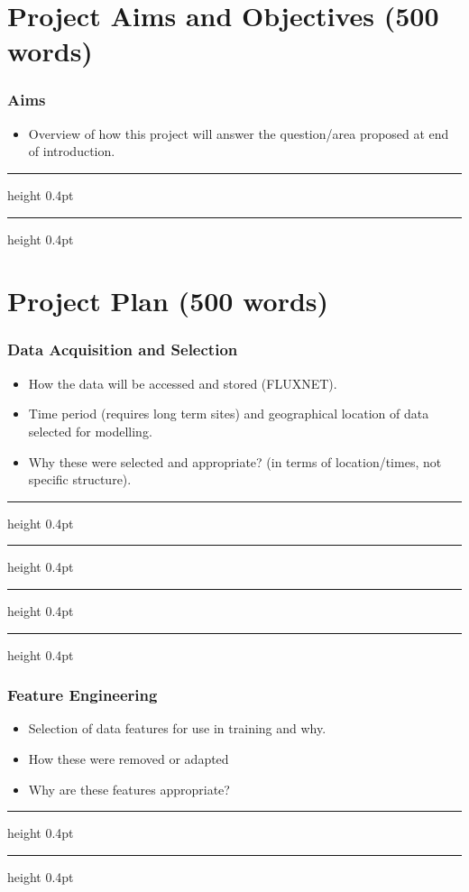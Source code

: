 \documentclass[paper=a4, fontsize=12pt]{scrartcl}
\newcommand{\notedivider}{%
	\vspace{4pt}%
	{\hrule height 0.4pt}%
	\vspace{6pt}%
	{\hrule height 0.4pt}
	\vspace{6pt}
}
\begin{document}
	
	
	\newpage
	\section{Project Aims and Objectives (500 words)}
	\subsubsection{Aims}
	\begin{itemize}
		\item Overview of how this project will answer the question/area proposed at end of introduction.
	\end{itemize}
	\notedivider
	
	\newpage
	\section{Project Plan (500 words)}
	\subsubsection{Data Acquisition and Selection}
	\begin{itemize}
		\item How the data will be accessed and stored (FLUXNET).
		\item Time period (requires long term sites) and geographical location of data selected for modelling.
		\item Why these were selected and appropriate? (in terms of location/times, not specific structure).
	\end{itemize}
	\notedivider
	
	\newpage
	\notedivider
	\subsubsection{Feature Engineering}
	\begin{itemize}
		\item Selection of data features for use in training and why.
		\item How these were removed or adapted
		\item Why are these features appropriate?
	\end{itemize}
	\notedivider
	
	\newpage
\end{document}
